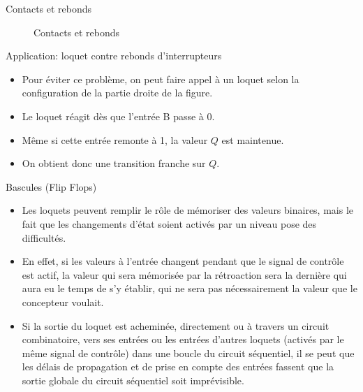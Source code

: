 \documentclass[presentation]{beamer}
\begin{document}
\begin{frame}[label={sec:org718ca82}]{Contacts et rebonds}
\begin{figure}[htbp]
\centering

\caption{\label{fig:org5ed2c3b}Contacts et rebonds}
\end{figure}
\end{frame}

\begin{frame}[label={sec:org4310c5d}]{Application: loquet contre rebonds d'interrupteurs}
\begin{itemize}
\item Pour éviter ce problème, on peut faire appel à un loquet selon la configuration de la partie droite de la figure.

\item Le loquet réagit dès que l'entrée B passe à 0.

\item Même si cette entrée remonte à 1, la valeur \(Q\) est maintenue.

\item On obtient donc une transition franche sur \(Q\).
\end{itemize}
\end{frame}

\begin{frame}[label={sec:org7ef1799}]{Bascules (Flip Flops)}
\begin{itemize}
\item Les loquets peuvent remplir le rôle de mémoriser des valeurs binaires, mais le fait que les changements d'état soient activés par un \alert{niveau} pose des difficultés.

\item En effet, si les valeurs à l'entrée changent pendant que le signal de contrôle est actif, la valeur qui sera mémorisée par la rétroaction sera la dernière qui aura eu le temps de s'y établir, qui ne sera pas nécessairement la valeur que le concepteur voulait.

\item Si la sortie du loquet est acheminée, directement ou à travers un circuit combinatoire, vers ses entrées ou les entrées d'autres loquets (activés par le même signal de contrôle) dans une boucle du circuit séquentiel, il se peut que les délais de propagation et de prise en compte des entrées fassent que la sortie globale du circuit séquentiel soit imprévisible.
\end{itemize}
\end{frame}
\end{document}
